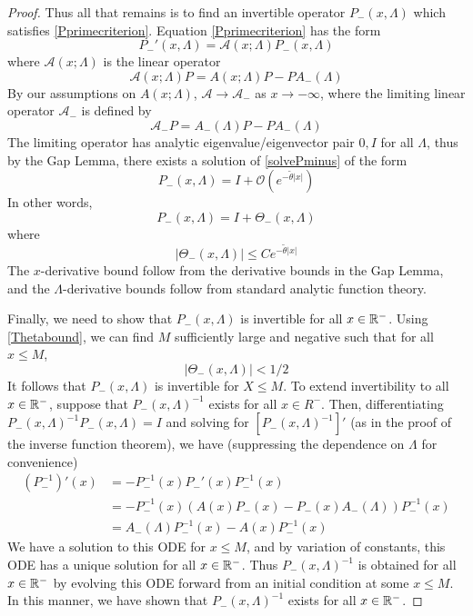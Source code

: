 \documentclass[thesis.tex]{subfiles}
\begin{document}
\begin{lemma}
\begin{proof}
Thus all that remains is to find an invertible operator $P_-(x, \Lambda)$ which satisfies \cref{Pprimecriterion}. Equation \cref{Pprimecriterion} has the form 
\begin{equation}\label{solvePminus}
P_-'(x, \Lambda) = \mathcal{A}(x; \Lambda) P_-(x, \Lambda)
\end{equation}
where $\mathcal{A}(x; \Lambda)$ is the linear operator
\[
\mathcal{A}(x; \Lambda) P = A(x; \Lambda) P - P A_-(\Lambda)
\]
By our assumptions on $A(x; \Lambda)$, $\mathcal{A} \rightarrow \mathcal{A}_-$ as $x \rightarrow -\infty$, where the limiting linear operator $\mathcal{A}_-$ is defined by
\[
\mathcal{A}_- P = A_-(\Lambda) P - P A_-(\Lambda)
\]
The limiting operator has analytic eigenvalue/eigenvector pair $0, I$ for all $\Lambda$, thus by the Gap Lemma, there exists a solution of \eqref{solvePminus} of the form 
\begin{equation*}
P_-(x, \Lambda) = I + \mathcal{O}(e^{-\tilde{\theta}|x|})
\end{equation*}
In other words, 
\begin{equation*}
P_-(x, \Lambda) = I + \Theta_-(x, \Lambda)
\end{equation*}
where 
\begin{equation}\label{Thetabound}
|\Theta_-(x, \Lambda)| \leq C e^{-\tilde{\theta}|x|}
\end{equation}
The $x$-derivative bound follow from the derivative bounds in the Gap Lemma, and the $\Lambda$-derivative bounds follow from standard analytic function theory.

Finally, we need to show that $P_-(x, \Lambda)$ is invertible for all $x \in \mathbb{R}^-$. Using \eqref{Thetabound}, we can find $M$ sufficiently large and negative such that for all $x \leq M$,
\[
|\Theta_-(x, \Lambda)| < 1/2
\]
It follows that $P_-(x, \Lambda)$ is invertible for $X \leq M$. To extend invertibility to all $x \in \mathbb{R}^-$, suppose that $P_-(x, \Lambda)^{-1}$ exists for all $x \in R^-$. Then, differentiating $P_-(x, \Lambda)^{-1} P_-(x, \Lambda) = I$ and solving for $[P_-(x, \Lambda)^{-1}]'$ (as in the proof of the inverse function theorem), we have (suppressing the dependence on $\Lambda$ for convenience)
\begin{align*}
(P_-^{-1})'(x) &= -P_-^{-1}(x)P_-'(x)P_-^{-1}(x) \\
&= -P_-^{-1}(x)( A(x)P_-(x) - P_-(x) A_-(\Lambda))P_-^{-1}(x) \\
&= A_-(\Lambda) P_-^{-1}(x) - A(x) P_-^{-1}(x)
\end{align*}
We have a solution to this ODE for $x \leq M$, and by variation of constants, this ODE has a unique solution for all $x \in \mathbb{R}^-$. Thus $P_-(x, \Lambda)^{-1}$ is obtained for all $x \in \mathbb{R}^-$ by evolving this ODE forward from an initial condition at some $x \leq M$. In this manner, we have shown that $P_-(x, \Lambda)^{-1}$ exists for all $x \in \mathbb{R}^-$.
\end{proof}
\end{lemma}
\end{document}
